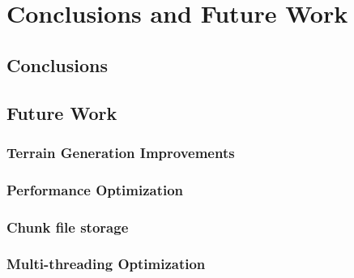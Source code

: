 \chapter{Conclusions and Future Work}
\label{chapter6}

\section{Conclusions}

\section{Future Work}

\subsection{Terrain Generation Improvements}

\subsection{Performance Optimization}

\subsection{Chunk file storage}

\subsection{Multi-threading Optimization} 
